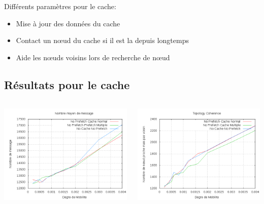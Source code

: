 \documentclass{beamer}
\begin{document}
  \begin{frame}
	Différents paramètres pour le cache:
	\begin{itemize}
		\item Mise à jour des données du cache
		\item Contact un nœud du cache si il est la depuis longtemps
		\item Aide les nœuds voisins lors de recherche de nœud	
	\end{itemize}
  \end{frame}

 
  \subsection{Résultats pour le cache}
  \begin{frame}
	\begin{columns}
         \begin{column}{5cm}
          \includegraphics[scale=0.25]{./Ressources/Images/Courbes_Final_Rapport/Nombre_Messages_Caches.png}\\
         \end{column}
         \begin{column}{5cm}
          \includegraphics[scale=0.25]{./Ressources/Images/Courbes_Final_Rapport/Topology_Coherence_Caches.png}\\

\end{column}
\end{columns}
\end{frame}
\end{document}
